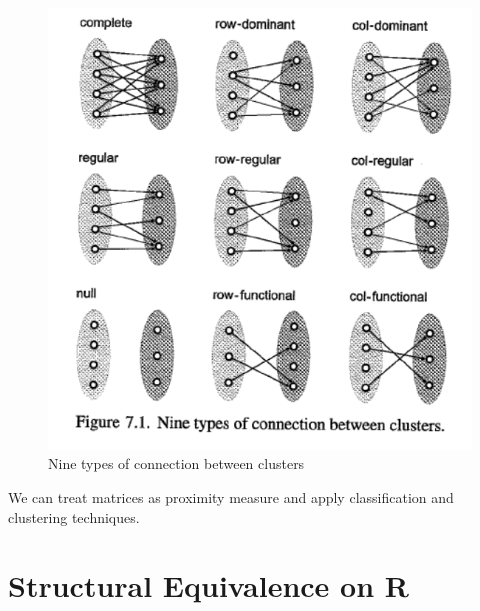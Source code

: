 \documentclass[
  notitlepage,
  onecolumn,
  openany]{book}
\begin{document}
\begin{figure}[h!]

{\centering \includegraphics[width=0.5\linewidth]{images/11-Subgroups and Structural Equivalence/Untitled 5} 

}

\caption{Nine types of connection between clusters}\label{fig:unnamed-chunk-87}
\end{figure}

We can treat matrices as proximity measure and apply classification and clustering techniques.

\hypertarget{structural-equivalence-on-r}{%
\section{Structural Equivalence on R}\label{structural-equivalence-on-r}}
\end{document}
